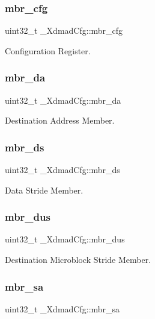 \subsubsection{\texorpdfstring{mbr\_cfg}{mbr\_cfg}}
{\footnotesize\ttfamily uint32\+\_\+t \+\_\+\+Xdmad\+Cfg\+::mbr\+\_\+cfg}

Configuration Register. \mbox{\label{struct__XdmadCfg_ad5cf84136517c0c4d7b97005af6a81b1}} 
\subsubsection{\texorpdfstring{mbr\_da}{mbr\_da}}
{\footnotesize\ttfamily uint32\+\_\+t \+\_\+\+Xdmad\+Cfg\+::mbr\+\_\+da}

Destination Address Member. \mbox{\label{struct__XdmadCfg_aa6bc8288d7a64857d13c2d2488e0d6db}} 
\subsubsection{\texorpdfstring{mbr\_ds}{mbr\_ds}}
{\footnotesize\ttfamily uint32\+\_\+t \+\_\+\+Xdmad\+Cfg\+::mbr\+\_\+ds}

Data Stride Member. \mbox{\label{struct__XdmadCfg_a86b6dda6f114e7b1e358325b249bb323}} 
\subsubsection{\texorpdfstring{mbr\_dus}{mbr\_dus}}
{\footnotesize\ttfamily uint32\+\_\+t \+\_\+\+Xdmad\+Cfg\+::mbr\+\_\+dus}

Destination Microblock Stride Member. \mbox{\label{struct__XdmadCfg_a96e6eb9b1a26b7364c5e8c7558eec46a}} 
\subsubsection{\texorpdfstring{mbr\_sa}{mbr\_sa}}
{\footnotesize\ttfamily uint32\+\_\+t \+\_\+\+Xdmad\+Cfg\+::mbr\+\_\+sa}

